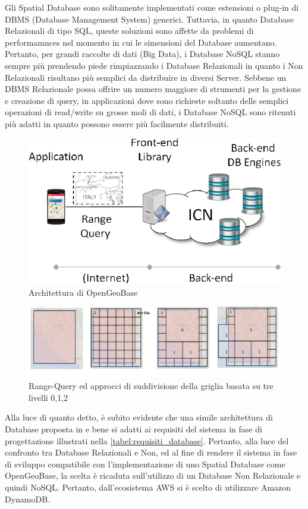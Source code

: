 Gli Spatial Database sono solitamente implementati come estensioni o plug-in di DBMS (Database Management System) generici. Tuttavia, in quanto Database Relazionali di tipo SQL, queste soluzioni sono affette da problemi di performamnces nel momento in cui le simensioni del Database aumentano. Pertanto, per grandi raccolte di dati (Big Data), i Database NoSQL stanno sempre più prendendo piede rimpiazzando i Database Relazionali in quanto i Non Relazionali risultano più semplici da distribuire in diversi Server. Sebbene un DBMS Relazionale possa offrire un numero maggiore di strumenti per la gestione e creazione di query, in applicazioni dove sono richieste soltanto delle semplici operazioni di read/write su grosse moli di dati, i Database NoSQL sono ritenuti più adatti in quanto possono essere più facilmente distribuiti.
\begin{figure}
	\begin{center}
		\includegraphics[width=0.6\columnwidth]{images/opengeobase_1}
	\end{center}
	\caption{Architettura di OpenGeoBase \cite{famous:paper_detti_1}}
	\label{fig:opengeobase_1}
\end{figure}
\begin{figure}
	\begin{center}
		\includegraphics[width=0.8\columnwidth]{images/opengeobase_2}
	\end{center}
	\caption{Range-Query ed approcci di suddivisione della griglia basata su tre livelli 0,1,2 \cite{famous:paper_detti_1}}
	\label{fig:opengeobase_2}
\end{figure}


Alla luce di quanto detto, è subito evidente che una simile architettura di Database proposta in \cite
{famous:paper_detti_1} e \cite{famous:paper_detti_2} bene si adatti ai requisiti del sistema in fase di progettazione illustrati nella \autoref{tabel:requisiti_database}. Pertanto, alla luce del confronto tra Database Relazionali e Non, ed al fine di rendere il sistema in fase di sviluppo compatibile con l'implementazione di uno Spatial Database come OpenGeoBase, la scelta è ricaduta sull'utilizzo di un Database Non Relazionale e quindi NoSQL. Pertanto, dall'ecosistema AWS si è scelto di utilizzare Amazon DynamoDB.

